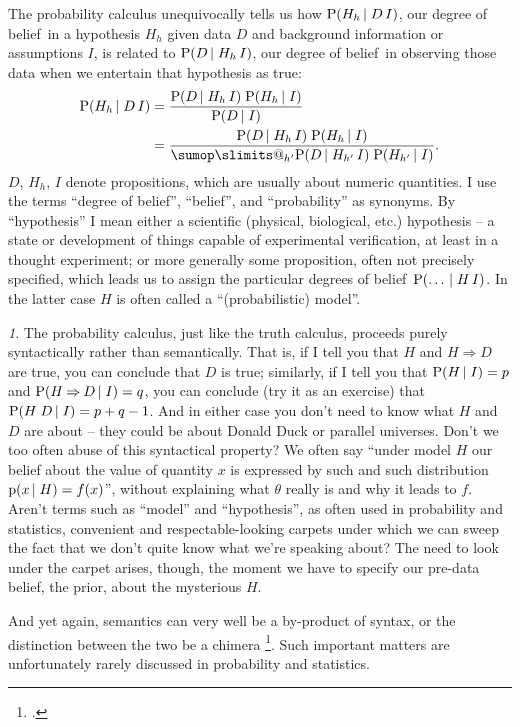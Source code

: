 \documentclass[\ifafour a4paper,12pt,\else a5paper,10pt,\fi%
onecolumn,oneside,article,%
british%
]{memoir}
\makeatletter
\theoremstyle{remark}
\theoremstyle{innote}
\newtheorem*{innote}{}
\def\sum{\DOTSI\sumop\slimits@}
\newcommand*{\citep}{\footcites}
\newcommand*{\limplies}{\mathbin{\Rightarrow}}%
\newcommand*{\pf}{\mathrm{p}}%
\newcommand*{\p}{\mathrm{P}}%
\renewcommand*{\|}[1][]{\nonscript\,#1\vert\nonscript\;\mathopen{}}
\newcommand*{\etc}{{etc.}}
\newcommand*{\dob}{degree of belief}
\newcommand*{\dobs}{degrees of belief}
\newcommand*{\yK}{I}
\makeatother
\begin{document}
The probability calculus unequivocally tells us how
$\p(H_{h} \| D \, \yK)$, our \dob\ in a hypothesis $H_{h}$ given data $D$
and background information or assumptions $\yK$, is related to
$\p(D \| H_{h} \, \yK)$, our \dob\ in observing those data when we
entertain that hypothesis as true:
\begin{subequations}
    \label{eq:posterior_hypothesis}
  \begin{align}
    \label{eq:posterior_hypothesis_universal}
    \p(H_{h} \| D \, \yK) &=
    \frac{\p(D \| H_{h} \, \yK)\;\p(H_{h} \| \yK)}{\p(D \| \yK)}\\
    \label{eq:posterior_hypothesis_sethypotheses}
    &=\frac{\p(D \| H_{h} \, \yK)\;\p(H_{h} \| \yK)}{\sum_{h'} \p(D \| H_{h'} \, \yK)\; \p(H_{h'} \| \yK)}.
  \end{align}
\end{subequations}
$D$, $H_{h}$, $\yK$ denote propositions, which are usually about numeric
quantities. I use the terms \enquote{\dob}, \enquote{belief}, and
\enquote{probability} as synonyms. By \enquote{hypothesis} I mean either a
scientific (physical, biological, \etc) hypothesis -- a state or
development of things capable of experimental verification, at least in a
thought experiment; or more generally some proposition, often not precisely
specified, which leads us to assign the particular \dobs\
$\p(\dotso \| H \, \yK)$. In the latter case $H$ is often called a
\enquote{(probabilistic) model}.
\begin{innote}\label{note:syntax}
  The probability calculus, just like the truth calculus, proceeds purely
  syntactically rather than semantically. That is, if I tell you that $H$
  and $H \limplies D$ are true, you can conclude that $D$ is true;
  similarly, if I tell you that $\p(H \| \yK) = p$ and
  $\p(H \limplies D \| \yK) = q$, you can conclude (try it as an exercise)
  that $\p(H\;D \| \yK) = p + q -1$. And in either case you don't need to
  know what $H$ and $D$ are about -- they could be about Donald Duck or
  parallel universes. Don't we too often abuse of this syntactical
  property? We often say \enquote{under model $H$ our belief about the
    value of quantity $x$ is expressed by such and such distribution
    $\pf(x \| H)=f(x)$}, without explaining what $\theta$ really is
  and why it leads to $f$. Aren't terms such as \enquote{model} and
  \enquote{hypothesis}, as often used in probability and statistics,
  convenient and respectable-looking carpets under which we can sweep the
  fact that we don't quite know what we're speaking about? The need to look
  under the carpet arises, though, the moment we have to specify our
  pre-data belief, the prior, about the mysterious $H$.
  
  And yet again, semantics can very well be a by-product of syntax, or the
  distinction between the two be a chimera
  \citep{wittgenstein1945_t1999,girard2001,girard2003}. Such important
  matters are unfortunately rarely discussed in probability and statistics.
\end{innote}
\end{document}
